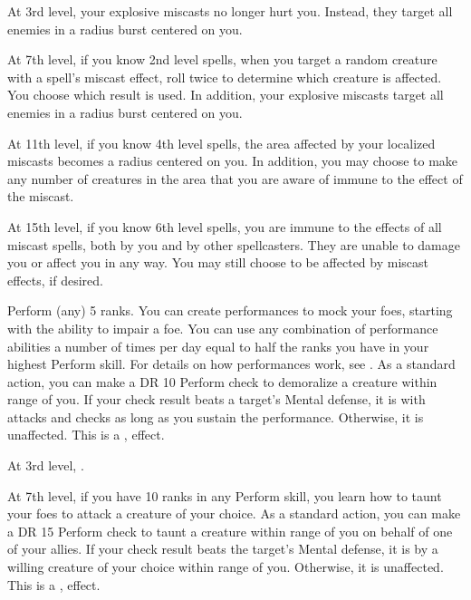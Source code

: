     At 3rd level, your explosive miscasts no longer hurt you.
    Instead, they target all enemies in a \areasmall radius burst centered on you.

    At 7th level, if you know 2nd level spells, when you target a random creature with a spell's miscast effect, roll twice to determine which creature is affected.
    You choose which result is used.
    In addition, your explosive miscasts target all enemies in a \areamed radius burst centered on you.

    At 11th level, if you know 4th level spells, the area affected by your localized miscasts becomes a \areamed radius centered on you.
    In addition, you may choose to make any number of creatures in the area that you are aware of immune to the effect of the miscast.

    At 15th level, if you know 6th level spells, you are immune to the effects of all miscast spells, both by you and by other spellcasters.
    They are unable to damage you or affect you in any way.
    You may still choose to be affected by miscast effects, if desired.

    \featpre Perform (any) 5 ranks.
    \featben You can create performances to mock your foes, starting with the ability to impair a foe.
    You can use any combination of performance abilities a number of times per day equal to half the ranks you have in your highest Perform skill.
    For details on how performances work, see .
     As a standard action, you can make a DR 10 Perform check to demoralize a creature within \rngmed range of you.
    If your check result beats a target's Mental defense, it is \impaired with attacks and checks as long as you sustain the performance.
    Otherwise, it is unaffected.
    This is a ,  effect.

    At 3rd level, \tdash.

    At 7th level, if you have 10 ranks in any Perform skill, you learn how to taunt your foes to attack a creature of your choice.
     As a standard action, you can make a DR 15 Perform check to taunt a creature within \rngmed range of you on behalf of one of your allies.
    If your check result beats the target's Mental defense, it is \taunted by a willing creature of your choice within \rngmed range of you.
    Otherwise, it is unaffected.
    This is a ,  effect.

